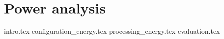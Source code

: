 \chapter{Power analysis}
\label{ch:6}
{intro.tex}
{configuration_energy.tex}
{processing_energy.tex}
{evaluation.tex}